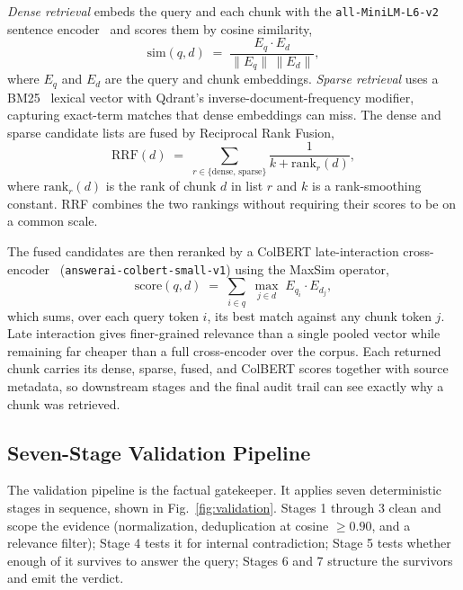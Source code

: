 \documentclass[conference]{IEEEtran}
\begin{document}
\textit{Dense retrieval} embeds the query and each chunk with the
\texttt{all-MiniLM-L6-v2} sentence encoder~\cite{reimers2019sbert} and
scores them by cosine similarity,
\begin{equation}
\mathrm{sim}(q,d) \;=\; \frac{E_q \cdot E_d}{\lVert E_q\rVert\,\lVert E_d\rVert},
\label{eq:cosine}
\end{equation}
where $E_q$ and $E_d$ are the query and chunk embeddings. \textit{Sparse
retrieval} uses a BM25~\cite{robertson2009bm25} lexical vector with Qdrant's
inverse-document-frequency modifier, capturing exact-term matches that dense
embeddings can miss.
The dense and sparse candidate lists are fused by Reciprocal Rank Fusion,
\begin{equation}
\mathrm{RRF}(d) \;=\; \sum_{r \in \{\text{dense},\,\text{sparse}\}}
\frac{1}{k + \mathrm{rank}_r(d)},
\label{eq:rrf}
\end{equation}
where $\mathrm{rank}_r(d)$ is the rank of chunk $d$ in list $r$ and $k$ is
a rank-smoothing constant. RRF combines the two rankings without requiring
their scores to be on a common scale.

The fused candidates are then reranked by a ColBERT late-interaction
cross-encoder~\cite{khattab2020colbert} (\texttt{answerai-colbert-small-v1})
using the MaxSim operator,
\begin{equation}
\mathrm{score}(q,d) \;=\; \sum_{i \in q}\; \max_{j \in d}\;
E_{q_i} \cdot E_{d_j},
\label{eq:maxsim}
\end{equation}
which sums, over each query token $i$, its best match against any chunk
token $j$. Late interaction gives finer-grained relevance than a single
pooled vector while remaining far cheaper than a full cross-encoder over
the corpus. Each returned chunk carries its dense, sparse, fused, and
ColBERT scores together with source metadata, so downstream stages and the
final audit trail can see exactly why a chunk was retrieved.

\subsection{Seven-Stage Validation Pipeline}
\label{sec:validation}
The validation pipeline is the factual gatekeeper. It applies seven
deterministic stages in sequence, shown in Fig.~\ref{fig:validation}.
Stages 1 through 3 clean and scope the evidence (normalization,
deduplication at cosine $\geq 0.90$, and a relevance filter); Stage 4 tests it for internal contradiction; Stage 5
tests whether enough of it survives to answer the query; Stages 6 and 7
structure the survivors and emit the verdict.
\end{document}
